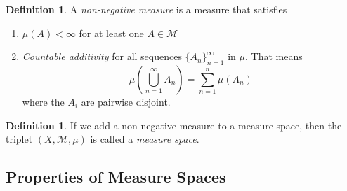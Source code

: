 \documentclass[12pt]{article}
\theoremstyle{plain}
\theoremstyle{definition}
\newtheorem{defn}[thm]{Definition}
\theoremstyle{remark}
\begin{document}
\begin{defn} 
A \emph{non-negative measure} is a measure that satisfies 
\begin{enumerate}
    \item $\mu(A)<\infty$ for at least one $A\in\mathscr{M}$ 
    \item \emph{Countable additivity} for all sequences $\{A_n\}_{n=1}^\infty$ in $\mu$. That means 
        \[
            \mu\left(\bigcup^\infty_{n=1}A_n\right) 
            = \sum^n_{n=1} \mu(A_n)
        \]
        where the $A_i$ are pairwise disjoint.
\end{enumerate}
\end{defn}

\begin{defn} 
If we add a non-negative measure to a measure space, then the triplet $(X,\mathscr{M},\mu)$ is called a \emph{measure space}. 
\end{defn}

\subsection{Properties of Measure Spaces}
\label{subsec:propmeas}
\end{document}
